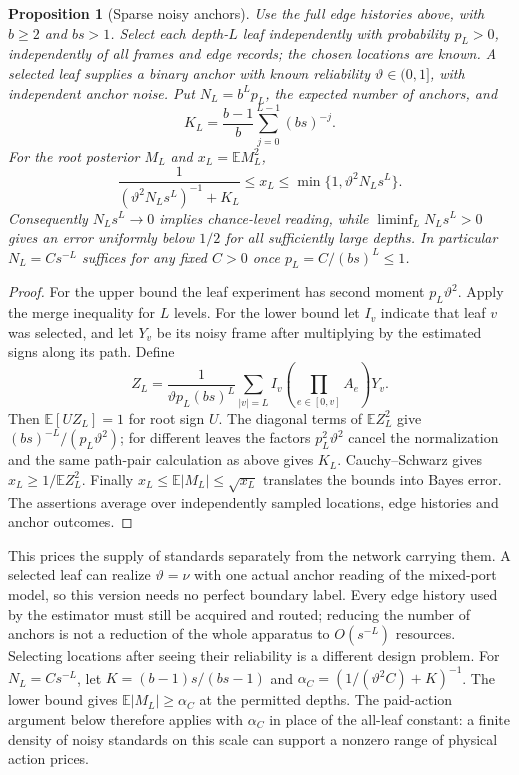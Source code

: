 \documentclass[11pt,a4paper]{article}
\newtheorem{proposition}[definition]{Proposition}
\newcommand{\E}{\mathbb E}
\begin{document}
\begin{proposition}[Sparse noisy anchors]\label{prop:sparseanchors}
Use the full edge histories above, with $b\ge2$ and $bs>1$. Select each depth-$L$ leaf independently with probability $p_L>0$, independently of all frames and edge records; the chosen locations are known. A selected leaf supplies a binary anchor with known reliability $\vartheta\in(0,1]$, with independent anchor noise. Put $N_L=b^Lp_L$, the expected number of anchors, and
\[
 K_L=\frac{b-1}{b}\sum_{j=0}^{L-1}(bs)^{-j}.
\]
For the root posterior $M_L$ and $x_L=\E M_L^2$,
\begin{equation}\label{eq:sparseanchors}
 \frac1{(\vartheta^2N_Ls^L)^{-1}+K_L}
 \le x_L\le\min\{1,\vartheta^2N_Ls^L\}.
\end{equation}
Consequently $N_Ls^L\to0$ implies chance-level reading, while $\liminf_L N_Ls^L>0$ gives an error uniformly below $1/2$ for all sufficiently large depths. In particular $N_L=C s^{-L}$ suffices for any fixed $C>0$ once $p_L=C/(bs)^L\le1$.
\end{proposition}
\begin{proof}
For the upper bound the leaf experiment has second moment $p_L\vartheta^2$. Apply the merge inequality for $L$ levels. For the lower bound let $I_v$ indicate that leaf $v$ was selected, and let $Y_v$ be its noisy frame after multiplying by the estimated signs along its path. Define
\[
 Z_L=\frac1{\vartheta p_L(bs)^L}
      \sum_{|v|=L} I_v\left(\prod_{e\in[0,v]}A_e\right)Y_v.
\]
Then $\E[UZ_L]=1$ for root sign $U$. The diagonal terms of $\E Z_L^2$ give $(bs)^{-L}/(p_L\vartheta^2)$; for different leaves the factors $p_L^2\vartheta^2$ cancel the normalization and the same path-pair calculation as above gives $K_L$. Cauchy--Schwarz gives $x_L\ge1/\E Z_L^2$. Finally $x_L\le\E|M_L|\le\sqrt{x_L}$ translates the bounds into Bayes error. The assertions average over independently sampled locations, edge histories and anchor outcomes.
\end{proof}

This prices the supply of standards separately from the network carrying them. A selected leaf can realize $\vartheta=\nu$ with one actual anchor reading of the mixed-port model, so this version needs no perfect boundary label. Every edge history used by the estimator must still be acquired and routed; reducing the number of anchors is not a reduction of the whole apparatus to $O(s^{-L})$ resources. Selecting locations after seeing their reliability is a different design problem. For $N_L=C s^{-L}$, let $K=(b-1)s/(bs-1)$ and $\alpha_C=(1/(\vartheta^2C)+K)^{-1}$. The lower bound gives $\E|M_L|\ge\alpha_C$ at the permitted depths. The paid-action argument below therefore applies with $\alpha_C$ in place of the all-leaf constant: a finite density of noisy standards on this scale can support a nonzero range of physical action prices.
\end{document}
